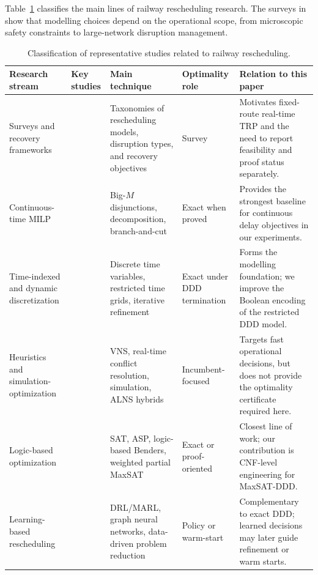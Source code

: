 \documentclass[runningheads]{llncs}
\begin{document}
Table~\ref{tab:related-work} classifies the main lines of railway
rescheduling research. The surveys in
\cite{FangYao2015,Cacchiani2014,Zhan2024Handling} show that modelling choices
depend on the operational scope, from microscopic safety constraints to
large-network disruption management.

\begin{table}
\centering
\caption{Classification of representative studies related to railway rescheduling.}
\label{tab:related-work}
\scriptsize
\setlength{\tabcolsep}{2.7pt}
\renewcommand{\arraystretch}{1.0}
\begin{tabular}{>{\raggedright\arraybackslash}p{24mm}>{\raggedright\arraybackslash}p{11mm}>{\raggedright\arraybackslash}p{25mm}>{\raggedright\arraybackslash}p{17mm}>{\raggedright\arraybackslash}p{35mm}}
\toprule
Research stream & Key studies & Main technique & Optimality role & Relation to this paper \\
\midrule
Surveys and recovery frameworks &
\cite{FangYao2015,Cacchiani2014,Lamorgese2018,Zhan2024Handling} &
Taxonomies of rescheduling models, disruption types, and recovery objectives &
Survey &
Motivates fixed-route real-time TRP and the need to report feasibility and proof status separately. \\
Continuous-time MILP &
\cite{LamorgeseMannino2015,ManninoNakkerud2023,Zhang2023Train} &
Big-$M$ disjunctions, decomposition, branch-and-cut &
Exact when proved &
Provides the strongest baseline for continuous delay objectives in our experiments. \\
Time-indexed and dynamic discretization &
\cite{Caimi2012,Boland2017,Croella2024} &
Discrete time variables, restricted time grids, iterative refinement &
Exact under DDD termination &
Forms the modelling foundation; we improve the Boolean encoding of the restricted DDD model. \\
Heuristics and simulation-optimization &
\cite{Sama2017,Bettinelli2017,Hassannayebi2020Simulation-optimization,Su2023Integrated} &
VNS, real-time conflict resolution, simulation, ALNS hybrids &
Incumbent-focused &
Targets fast operational decisions, but does not provide the optimality certificate required here. \\
Logic-based optimization &
\cite{Matos2021,Abels2021,LeutwilerCorman2022,Croella2024} &
SAT, ASP, logic-based Benders, weighted partial MaxSAT &
Exact or proof-oriented &
Closest line of work; our contribution is CNF-level engineering for MaxSAT-DDD. \\
Learning-based rescheduling &
\cite{Cao2022Train,Dong2024Deep,Liao2021A,Kovari2023Multi-Agent,Huang2025,Sehmisch2025A} &
DRL/MARL, graph neural networks, data-driven problem reduction &
Policy or warm-start &
Complementary to exact DDD; learned decisions may later guide refinement or warm starts. \\
\bottomrule
\end{tabular}
\end{table}
\end{document}
